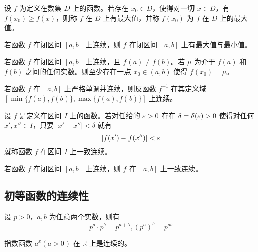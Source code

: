 \begin{definition}
	设 $f$ 为定义在数集 $D$ 上的函数。若存在 $x_0\in D$，使得对一切 $x\in D$，有 $f(x_0)\ge f(x)$，则称 $f$ 在 $D$ 上有最大值，并称 $f(x_0)$ 为 $f$ 在 $D$ 上的最大值。
\end{definition}

\begin{theorem}[最大、最小值定理]
	若函数 $f$ 在闭区间 $[a,b]$ 上连续，则 $f$ 在闭区间 $[a,b]$ 上有最大值与最小值。
\end{theorem}

\begin{theorem}[介值定理]
	若函数 $f$ 在闭区间 $[a,b]$ 上连续，且 $f(a)\ne f(b)$。若 $\mu$ 为介于 $f(a)$ 和 $f(b)$ 之间的任何实数。则至少存在一点 $x_0\in (a,b)$ 使得 $f(x_0)=\mu$。
\end{theorem}

\begin{theorem}
	若函数 $f$ 在 $[a,b]$ 上严格单调并连续，则反函数 $f^{-1}$ 在其定义域 $[\min\{f(a),f(b)\},\max\{f(a),f(b)\}]$ 上连续。
\end{theorem}

\begin{definition}
	设 $f$ 是定义在区间 $I$ 上的函数。若对任给的 $\varepsilon>0$ 存在 $\delta=\delta(\varepsilon)>0$ 使得对任何 $x',x''\in I$，只要 $|x'-x''|<\delta$ 就有
	\[ |f(x')-f(x'')|<\varepsilon \]
	就称函数 $f$ 在区间 $I$ 上一致连续。
\end{definition}

\begin{theorem}[一致连续性]
	若函数 $f$ 在闭区间 $[a,b]$ 上连续，则 $f$ 在 $[a,b]$ 上一致连续。
\end{theorem}

\subsection{初等函数的连续性}

\begin{theorem}
	设 $p>0$，$a,b$ 为任意两个实数，则有
	\[ p^a\cdot p^b = p^{a+b},(p^a)^b=p^{ab} \]
\end{theorem}

\begin{theorem}
	指数函数 $a^x(a>0)$ 在 $\mathbb{R}$ 上是连续的。
\end{theorem}


